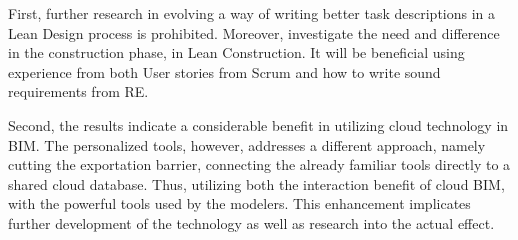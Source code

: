 First, further research in evolving a way of writing better task descriptions in a Lean Design process is prohibited. Moreover, investigate the need and difference in the construction phase, in Lean Construction. It will be beneficial using experience from both User stories from Scrum and how to write sound requirements from RE.
	 
Second, the results indicate a considerable benefit in utilizing cloud technology in BIM. The personalized tools, however, addresses a different approach, namely cutting the exportation barrier, connecting the already familiar tools directly to a shared cloud database. Thus, utilizing both the interaction benefit of cloud BIM, with the powerful tools used by the modelers. This enhancement implicates further development of the technology as well as research into the actual effect.

\cleardoublepage